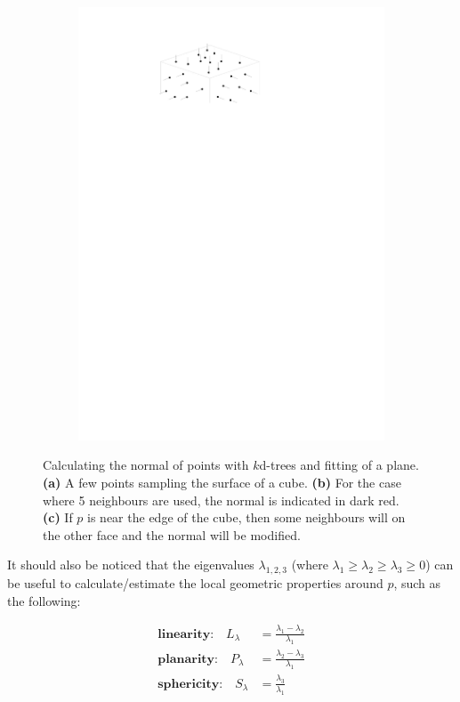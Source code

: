 \begin{figure}
\begin{subfigure}[b]{0.3\linewidth}
    \includegraphics[width=\textwidth,page=3]{normal.pdf}
    \caption{}\label{fig:normal:c}
  \end{subfigure}
  \caption{Calculating the normal of points with $k$d-trees and fitting of a plane. \textbf{(a)} A few points sampling the surface of a cube. \textbf{(b)} For the case where 5 neighbours are used, the normal is indicated in dark red. \textbf{(c)} If $p$ is near the edge of the cube, then some neighbours will on the other face and the normal will be modified.}%
\label{fig:knn_normal}
\end{figure}



It should also be noticed that the eigenvalues $\lambda_{1,2,3}$ (where $\lambda_1 \geq \lambda_2 \geq \lambda_3 \geq 0$) can be useful to calculate/estimate the local geometric properties around $p$, such as the following:

\begin{equation}
\begin{aligned}
\textbf{linearity:} \quad L_\lambda &= \frac{\lambda_1 - \lambda_2}{\lambda_1} \\
\textbf{planarity:} \quad P_\lambda &= \frac{\lambda_2 - \lambda_3}{\lambda_1} \\
\textbf{sphericity:} \quad S_\lambda &= \frac{\lambda_3}{\lambda_1} \\
\end{aligned}
\end{equation}


